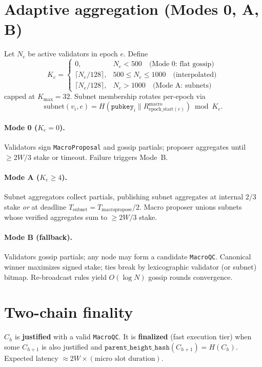 \documentclass[11pt,a4paper,twoside]{report}
\theoremstyle{definition}
\begin{document}
\section{Adaptive aggregation (Modes 0, A, B)}
\label{sec:modes}
Let $N_e$ be active validators in epoch $e$. Define
\begin{equation}
  K_e =
  \begin{cases}
    0, & N_e < 500 \quad \text{(Mode 0: flat gossip)}\\
    \bigl\lceil N_e / 128 \bigr\rceil, & 500 \leq N_e \leq 1000 \quad \text{(interpolated)}\\
    \bigl\lceil N_e / 128 \bigr\rceil, & N_e > 1000 \quad \text{(Mode A: subnets)}
  \end{cases}
\end{equation}
capped at $K_{\max} = 32$. Subnet membership rotates per-epoch via
\begin{equation}
  \mathrm{subnet}(v_i,e) = H(\texttt{pubkey}_i \| R^{\mathrm{macro}}_{\mathrm{epoch\_start}(e)}) \bmod K_e.
\end{equation}

\paragraph{Mode 0 ($K_e=0$).} Validators sign \texttt{MacroProposal} and gossip partials; proposer aggregates until $\geq 2W/3$ stake or timeout. Failure triggers Mode~B.

\paragraph{Mode A ($K_e \geq 4$).} Subnet aggregators collect partials, publishing subnet aggregates at internal $2/3$ stake \emph{or} at deadline $T_{\mathrm{subnet}} = T_{\mathrm{macropropose}}/2$. Macro proposer unions subnets whose verified aggregates sum to $\geq 2W/3$ stake.

\paragraph{Mode B (fallback).} Validators gossip partials; any node may form a candidate \texttt{MacroQC}. Canonical winner maximizes signed stake; ties break by lexicographic validator (or subnet) bitmap. Re-broadcast rules yield $O(\log N)$ gossip rounds convergence.

\section{Two-chain finality}
$C_h$ is \textbf{justified} with a valid \texttt{MacroQC}. It is \textbf{finalized} (fast execution tier) when some $C_{h+1}$ is also justified and $\texttt{parent\_height\_hash}(C_{h+1}) = H(C_h)$. Expected latency $\approx 2W \times (\text{micro slot duration})$.
\end{document}
